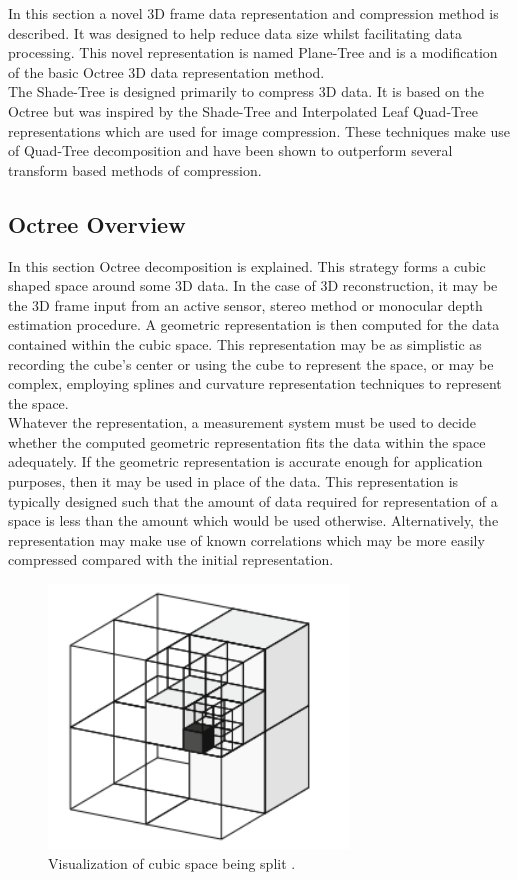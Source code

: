 In this section a novel 3D frame data representation and compression method is described. It was designed to help reduce data size whilst facilitating data processing. This novel representation is named Plane-Tree and is a modification of the basic Octree 3D data representation method. \\

The Shade-Tree is designed primarily to compress 3D data. It is based on the Octree but was inspired by the Shade-Tree and Interpolated Leaf Quad-Tree representations \cite{Gonzalez07ShadeTree, Lincoln13Interpolating} which are used for image compression. These techniques make use of Quad-Tree decomposition and have been shown to outperform several transform based methods of compression. 

\subsection{Octree Overview}

In this section Octree decomposition is explained. This strategy forms a cubic shaped space around some 3D data. In the case of 3D reconstruction, it may be the 3D frame input from an active sensor, stereo method or monocular depth estimation procedure. A geometric representation is then computed for the data contained within the cubic space. This representation may be as simplistic as recording the cube's center or using the cube to represent the space, or may be complex, employing splines and curvature representation techniques to represent the space. \\

Whatever the representation, a measurement system must be used to decide whether the computed geometric representation fits the data within the space adequately. If the geometric representation is accurate enough for application purposes, then it may be used in place of the data. This representation is typically designed such that the amount of data required for representation of a space is less than the amount which would be used otherwise. Alternatively, the representation may make use of known correlations which may be more easily compressed compared with the initial representation. \\


\begin{figure}[!htb]
\centering
\includegraphics[width=8cm]{images/methodology/pt/octreeVis}
\caption{Visualization of cubic space being split \cite{Hornung13Octomap}.}
\label{fig:SpaceVis}
\end{figure}

